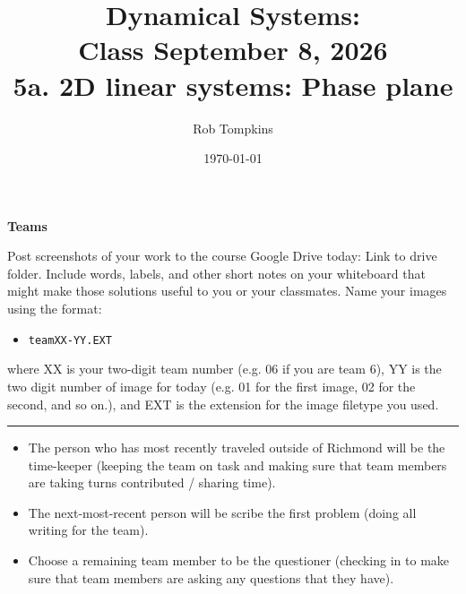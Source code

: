 \documentclass[12pt]{amsart}
\title{Dynamical Systems:\\Class September 8, 2026\\ 5a. 2D linear systems: Phase plane}
\author{Rob Tompkins}
\date{\today}
\theoremstyle{conjecture}
\theoremstyle{definition}
\theoremstyle{question}
\theoremstyle{theorem}
\newcommand{\rulehead}[1]{\vspace{2pt}\hrule\vspace{5pt}{\large\bfseries #1}\par}
\begin{document}
    \maketitle
    {\large\bfseries Teams}

    Post screenshots of your work to the course Google Drive today: Link to drive folder. Include words, labels, and other short notes on your whiteboard that might make those solutions useful to you or your classmates. Name your images using the format:
    \begin{itemize}\item \texttt{teamXX-YY.EXT}\end{itemize}
    where XX is your two-digit team number (e.g. 06 if you are team 6), YY is the two digit number of image for today (e.g. 01 for the first image, 02 for the second, and so on.), and EXT is the extension for the image filetype you used.

    \rulehead{Assigning roles}
    \begin{itemize}
        \item The person who has most recently traveled outside of Richmond will be the time-keeper (keeping the team on task and making sure that team members are taking turns contributed / sharing time).
        \item The next-most-recent person will be scribe the first problem (doing all writing for the team).
        \item Choose a remaining team member to be the questioner (checking in to make sure that team members are asking any questions that they have).
    \end{itemize}
\end{document}
